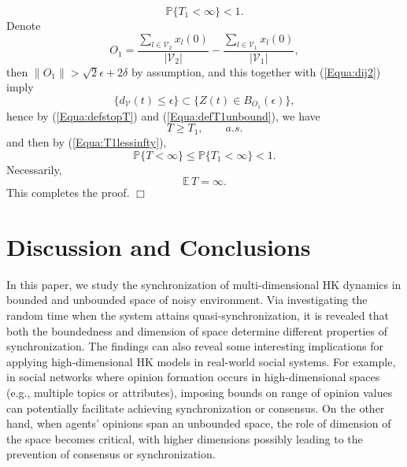 \documentclass[11pt]{article}
\theoremstyle{definition}
\theoremstyle{remark}
\numberwithin{equation}{section}
\begin{document}
\begin{equation}\label{Equa:T1lessinfty}
 \mathbb{P}\{T_1<\infty\}<1.
\end{equation}
Denote
\begin{equation*}
  O_1=\frac{\sum_{l\in\mathcal{V}_2}x_l(0)}{|\mathcal{V}_2|}-\frac{\sum_{l\in\mathcal{V}_1}x_l(0)}{|\mathcal{V}_1|},
\end{equation*}
then $\| O_1\|>\sqrt{2}\epsilon+2\delta$ by assumption, and this together with (\ref{Equa:dij2}) imply
\begin{equation*}
  \{d_\mathcal{V}(t)\leq\epsilon\}\subset\{Z(t)\in B_{O_1}(\epsilon)\},
\end{equation*}
hence by (\ref{Equa:defstopT}) and (\ref{Equa:defT1unbound}), we have
\begin{equation}\label{Equa:TgeqT1}
  T\geq T_1, \qquad a.s.
\end{equation}
and then by (\ref{Equa:T1lessinfty}),
\begin{equation}\label{Equa:Tlessinfty}
 \mathbb{P}\{T<\infty\}\leq \mathbb{P}\{T_1<\infty\}<1.
\end{equation}
Necessarily,
\begin{equation*}
  \mathbb{E}\,T=\infty.
\end{equation*}
This completes the proof.
\hfill $\Box$

\section{Discussion  and Conclusions}\label{Section:Conclusions}

In this paper, we study the synchronization of multi-dimensional HK dynamics in bounded and unbounded space of noisy environment. Via investigating the random time when the system attains quasi-synchronization, it is revealed that both the boundedness and dimension of space determine different properties of synchronization. The findings can also reveal some interesting implications for applying high-dimensional HK models in real-world social systems. For example, in social networks where opinion formation occurs in high-dimensional spaces (e.g., multiple topics or attributes), imposing bounds on range of opinion values can potentially facilitate achieving synchronization or consensus. On the other hand, when agents' opinions span an unbounded space, the role of dimension of the space becomes critical, with higher dimensions possibly leading to the prevention of consensus or synchronization.
\end{document}
